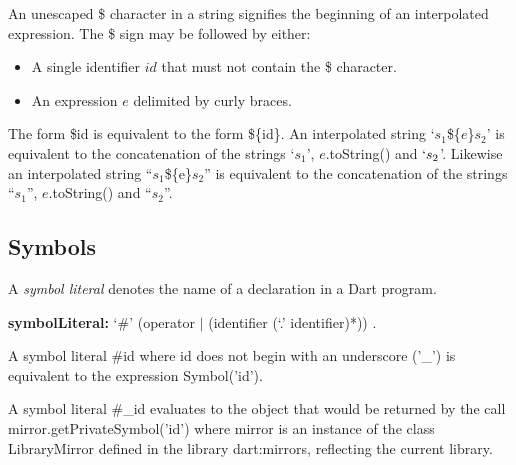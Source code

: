 \documentclass{article}
\newcommand{\code}[1]{{\sf #1}}
\begin{document}

\LMHash{}
An unescaped \$ character in a string signifies the beginning of an interpolated expression.  The \$ sign may be followed by either:
\begin{itemize}
\item A single identifier $id$ that must not contain the \$ character. 
\item An expression $e$ delimited by curly braces.
\end{itemize}

\LMHash{}
The form \code{\$id} is equivalent to the form \code{\$\{id\}}.  An interpolated string \code{`$s_1$\$\{$e$\}$s_2$'}  is equivalent to the concatenation of the  strings \code{`$s_1$'},  \code{$e$.toString()} and  \code{$`s_2$'}. Likewise an interpolated string \code{``$s_1$\$\{e\}$s_2$''} is equivalent to the concatenation of the strings \code{``$s_1$''}, \code{$e$.toString()} and  \code{``$s_2$''}.

\subsection{Symbols}

\LMHash{}
A {\em symbol literal} denotes the name of a declaration in a Dart program. 

\begin{grammar}
{\bf symbolLiteral:}
      `\#'  (operator $|$ (identifier (`{\escapegrammar .}' identifier)*))  .
\end{grammar}

\LMHash{}
A symbol literal \code{\#id} where \code{id} does not begin with an underscore ('\code{\_}')  is equivalent to the expression \code{\CONST{} Symbol('id')}.  

\LMHash{}
A symbol literal \code{\#\_id} evaluates to the object that would be returned by the call \code{mirror.getPrivateSymbol('id')} where mirror is an instance of the class \code{LibraryMirror} defined in the library \code{dart:mirrors}, reflecting the current library.
\end{document}
